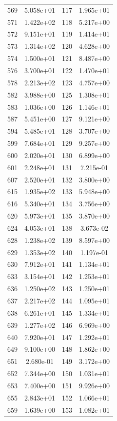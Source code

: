 \documentclass[12pt]{article}
\begin{document}
\begin{longtable}{@{}cccc@{}}
569 & 5.058e+01 & 117 & 1.965e+01 \\
571 & 1.422e+02 & 118 & 5.217e+00 \\
572 & 9.151e+01 & 119 & 1.414e+01 \\
573 & 1.314e+02 & 120 & 4.628e+00 \\
574 & 1.500e+01 & 121 & 8.487e+00 \\
576 & 3.700e+01 & 122 & 1.470e+01 \\
578 & 2.213e+02 & 123 & 4.757e+00 \\
582 & 3.988e+00 & 125 & 1.308e+01 \\
583 & 1.036e+00 & 126 & 1.146e+01 \\
587 & 5.451e+00 & 127 & 9.121e+00 \\
594 & 5.485e+01 & 128 & 3.707e+00 \\
599 & 7.684e+01 & 129 & 9.257e+00 \\
600 & 2.020e+01 & 130 & 6.899e+00 \\
601 & 2.248e+01 & 131 & 7.215e-01 \\
607 & 2.520e+01 & 132 & 3.800e+00 \\
615 & 1.935e+02 & 133 & 5.948e+00 \\
616 & 5.340e+01 & 134 & 3.756e+00 \\
620 & 5.973e+01 & 135 & 3.870e+00 \\
624 & 4.053e+01 & 138 & 3.673e-02 \\
628 & 1.238e+02 & 139 & 8.597e+00 \\
629 & 1.353e+02 & 140 & 1.197e-01 \\
630 & 7.912e+01 & 141 & 1.134e+01 \\
633 & 3.154e+01 & 142 & 1.253e+01 \\
636 & 1.250e+02 & 143 & 1.250e+01 \\
637 & 2.217e+02 & 144 & 1.095e+01 \\
638 & 6.261e+01 & 145 & 1.334e+01 \\
639 & 1.277e+02 & 146 & 6.969e+00 \\
640 & 7.920e+01 & 147 & 1.292e+01 \\
649 & 9.100e+00 & 148 & 1.862e+00 \\
651 & 2.680e-01 & 149 & 3.172e+00 \\
652 & 7.344e+00 & 150 & 1.031e+01 \\
653 & 7.400e+00 & 151 & 9.926e+00 \\
655 & 2.843e+01 & 152 & 1.066e+01 \\
659 & 1.639e+00 & 153 & 1.082e+01 \\

\end{longtable}
\end{document}
